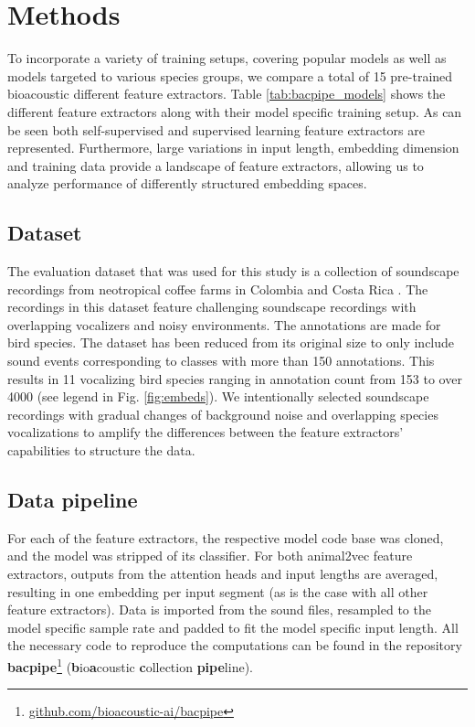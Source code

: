 \section{Methods}
\label{sec:methods}

To incorporate a variety of training setups, covering popular models as well as models targeted to various species groups, we compare a total of 15 pre-trained bioacoustic different feature extractors.
Table \ref{tab:bacpipe_models} shows the different feature extractors along with their model specific training setup. 
As can be seen both self-supervised and supervised learning feature extractors are represented. 
Furthermore, large variations in input length, embedding dimension and training data provide a landscape of feature extractors, allowing us to analyze performance of differently structured embedding spaces.

\subsection{Dataset}
\label{ssub:dataset}

The evaluation dataset that was used for this study is a collection of soundscape recordings from neotropical coffee farms in Colombia and Costa Rica \cite{vega-hidalgo_collection_2023}.
The recordings in this dataset feature challenging soundscape recordings with overlapping vocalizers and noisy environments.
The annotations are made for bird species.
The dataset has been reduced from its original size to only include sound events corresponding to classes with more than 150 annotations.
This results in 11 vocalizing bird species ranging in annotation count from 153 to over 4000 (see legend in Fig. \ref{fig:embeds}).
We intentionally selected soundscape recordings with gradual changes of background noise and overlapping species vocalizations to amplify the differences between the feature extractors' capabilities to structure the data.





\subsection{Data pipeline}
\label{ssub:data_pipe}

For each of the feature extractors, the respective model code base was cloned, and the model was stripped of its classifier.
For both animal2vec feature extractors, outputs from the attention heads and input lengths are averaged, resulting in one embedding per input segment (as is the case with all other feature extractors).
Data is imported from the sound files, resampled to the model specific sample rate and padded to fit the model specific input length.
All the necessary code to reproduce the computations can be found in the repository \textbf{bacpipe}\footnote{\url{github.com/bioacoustic-ai/bacpipe}} (\textbf{b}io\textbf{a}coustic \textbf{c}ollection \textbf{pipe}line).


